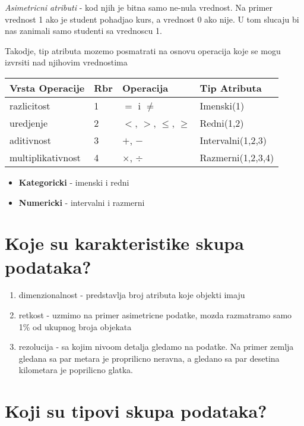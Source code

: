 \documentclass[a4paper]{article}
\begin{document}
\emph{Asimetricni atributi} - kod njih je bitna samo ne-nula vrednost. Na
primer vrednost 1 ako je student pohadjao kurs, a vrednost 0 ako nije. U tom slucaju bi nas zanimali
samo studenti sa vrednoscu 1.

Takodje, tip atributa mozemo posmatrati na osnovu operacija koje se mogu izvrsiti nad njihovim
vrednostima

\begin{center}\begin{tabular}{llll}
    \hline
    Vrsta Operacije & Rbr & Operacija & Tip Atributa \\ \hline
    razlicitost & 1 & \(=\) i \(\neq\)& Imenski(1) \\
    uredjenje & 2 & \(<\), \(>\), \(\leqslant\), \(\geqslant\) & Redni(1,2) \\
    aditivnost & 3 & \(+\), \(-\) & Intervalni(1,2,3) \\
    multiplikativnost & 4 & \(\times\), \(\div\) & Razmerni(1,2,3,4) \\ \hline
\end{tabular}\end{center} 

\begin{itemize}
    \item \textbf{Kategoricki} - imenski i redni
    \item \textbf{Numericki} - intervalni i razmerni
\end{itemize}

\section{Koje su karakteristike skupa podataka?}

\begin{enumerate}
    \item dimenzionalnost - predstavlja broj atributa koje objekti imaju
    \item retkost - uzmimo na primer asimetricne podatke, mozda razmatramo samo 1\% od ukupnog broja
        objekata
    \item rezolucija - sa kojim nivoom detalja gledamo na podatke. Na primer zemlja gledana sa par
        metara je proprilicno neravna, a gledano sa par desetina kilometara je poprilicno glatka.
\end{enumerate}

\section{Koji su tipovi skupa podataka?}
\end{document}
